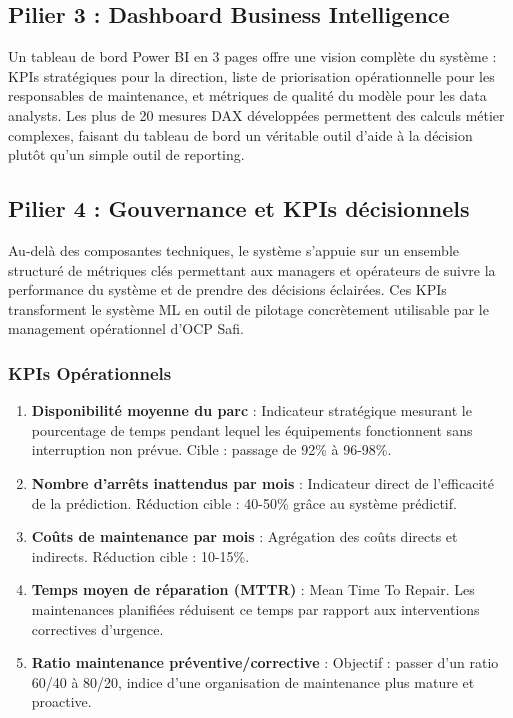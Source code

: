 \documentclass[a4paper,12pt]{report}
\begin{document}
\subsection{Pilier 3 : Dashboard Business Intelligence}

Un tableau de bord Power BI en 3 pages offre une vision complète du système : KPIs stratégiques pour la direction, liste de priorisation opérationnelle pour les responsables de maintenance, et métriques de qualité du modèle pour les data analysts. Les plus de 20 mesures DAX développées permettent des calculs métier complexes, faisant du tableau de bord un véritable outil d'aide à la décision plutôt qu'un simple outil de reporting.

\subsection{Pilier 4 : Gouvernance et KPIs décisionnels}

Au-delà des composantes techniques, le système s'appuie sur un ensemble structuré de métriques clés permettant aux managers et opérateurs de suivre la performance du système et de prendre des décisions éclairées. Ces KPIs transforment le système ML en outil de pilotage concrètement utilisable par le management opérationnel d'OCP Safi.

\subsubsection{KPIs Opérationnels}

\begin{enumerate}
    \item \textbf{Disponibilité moyenne du parc} : Indicateur stratégique mesurant le pourcentage de temps pendant lequel les équipements fonctionnent sans interruption non prévue. Cible : passage de 92\% à 96-98\%.
    
    \item \textbf{Nombre d'arrêts inattendus par mois} : Indicateur direct de l'efficacité de la prédiction. Réduction cible : 40-50\% grâce au système prédictif.
    
    \item \textbf{Coûts de maintenance par mois} : Agrégation des coûts directs et indirects. Réduction cible : 10-15\%.
    
    \item \textbf{Temps moyen de réparation (MTTR)} : Mean Time To Repair. Les maintenances planifiées réduisent ce temps par rapport aux interventions correctives d'urgence.
    
    \item \textbf{Ratio maintenance préventive/corrective} : Objectif : passer d'un ratio 60/40 à 80/20, indice d'une organisation de maintenance plus mature et proactive.
\end{enumerate}
\end{document}
